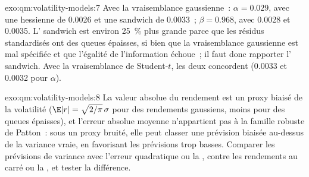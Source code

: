 \begin{solution}{exo:qm:volatility-models:7}
Avec la vraisemblance gaussienne~: $\alpha = 0.029$, avec une  hessienne de 0.0026 et une  sandwich de 0.0033~; $\beta = 0.968$, avec 0.0028 et 0.0035. L' sandwich est environ 25~\%
plus grande parce que les résidus standardisés ont des queues épaisses, si bien que la vraisemblance gaussienne est mal spécifiée et que l'égalité de l'information échoue~; il faut donc rapporter l' sandwich.
Avec la vraisemblance de Student-$t$, les deux concordent (0.0033 et 0.0032 pour $\alpha$).
\end{solution}

\begin{solution}{exo:qm:volatility-models:8}
La valeur absolue du rendement est un proxy biaisé de la volatilité ($\E|r| = \sqrt{2/\pi}\,\sigma$ pour des rendements gaussiens, moins pour des queues épaisses), et l'erreur absolue moyenne n'appartient pas
à la famille robuste de Patton~: sous un proxy bruité, elle peut classer une prévision biaisée au-dessus de la variance vraie, en favorisant les prévisions trop basses. Comparer les prévisions de variance
avec l'erreur quadratique ou la , contre les rendements au carré ou la , et tester la différence.
\end{solution}

